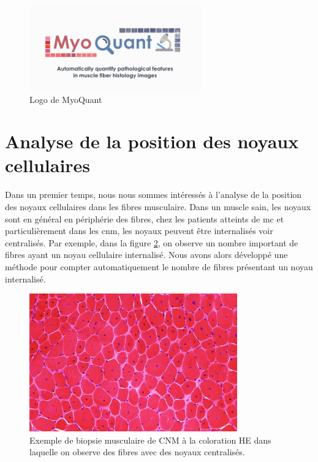 \begin{figure}[htbp]
 \centering
 \includegraphics[width=0.66\textwidth]{figures/myoquant_logo.png}
 \caption[Logo MyoQuant]{Logo de MyoQuant}
 \label{fig:myoquant_logo}
\end{figure}

\section{Analyse de la position des noyaux cellulaires}
Dans un premier temps, nous nous sommes intéressés à l'analyse de la position des noyaux cellulaires dans les fibres musculaire. Dans un muscle sain, les noyaux sont en général en périphérie des fibres, chez les patients atteints de \gls{mc} et particulièrement dans les \gls{cnm}, les noyaux peuvent être internalisés voir centralisés. Par exemple, dans la figure \ref{fig:he_example}, on observe un nombre important de fibres ayant un noyau cellulaire internalisé. Nous avons alors développé une méthode pour compter automatiquement le nombre de fibres présentant un noyau internalisé.
\begin{figure}[htbp]
 \centering
 \includegraphics[width=0.8\textwidth]{figures/he_example.jpg}
 \caption[Exemple de biopsie musculaire à la coloration HE]{Exemple de biopsie musculaire de CNM à la coloration HE dans laquelle on observe des fibres avec des noyaux centralisés.}
 \label{fig:he_example}
\end{figure}

